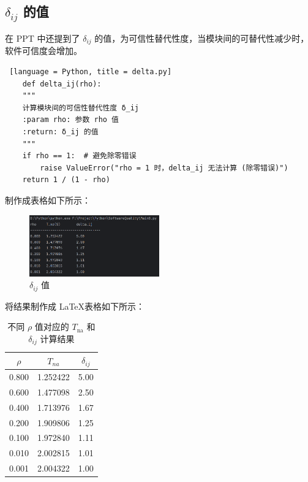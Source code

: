 \documentclass[14pt,a4paper,UTF8,twoside]{article}
\begin{document}
\subsection{\texorpdfstring{$\delta_{ij}$}{delta_ij} 的值 }

在 PPT 中还提到了 $\delta_{ij}$ 的值，为可信性替代性度，当模块间的可替代性减少时，软件可信度会增加。

\begin{lstlisting} [language = Python, title = delta.py]
    def delta_ij(rho):
    """
    计算模块间的可信性替代性度 δ_ij
    :param rho: 参数 rho 值
    :return: δ_ij 的值
    """
    if rho == 1:  # 避免除零错误
        raise ValueError("rho = 1 时，delta_ij 无法计算 (除零错误)")
    return 1 / (1 - rho)
\end{lstlisting}

制作成表格如下所示：

\begin{figure}[H]
    \centering
    \includegraphics[width=0.5\textwidth]{img8/delta.png}
    \caption{$\delta_{ij}$ 值}
\end{figure}

将结果制作成 \LaTeX 表格如下所示：

\begin{table}[H]
    \centering
    \begin{tabular}{|c|c|c|}
    \hline
    \textbf{$\rho$} & \textbf{$T_{na}$} & \textbf{$\delta_{ij}$} \\ \hline
    0.800 & 1.252422 & 5.00 \\ \hline
    0.600 & 1.477098 & 2.50 \\ \hline
    0.400 & 1.713976 & 1.67 \\ \hline
    0.200 & 1.909806 & 1.25 \\ \hline
    0.100 & 1.972840 & 1.11 \\ \hline
    0.010 & 2.002815 & 1.01 \\ \hline
    0.001 & 2.004322 & 1.00 \\ \hline
    \end{tabular}
    \caption{不同 $\rho$ 值对应的 $T_{\text{na}}$ 和 $\delta_{ij}$ 计算结果}
    \label{tab:Tna_deltaij}
\end{table}
    
\end{document}
